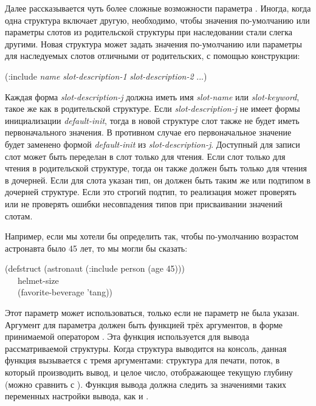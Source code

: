 \begin{flushdesc}
  Далее рассказывается чуть более сложные возможности параметра .
  Иногда, когда одна структура включает другую, необходимо, чтобы значения
  по-умолчанию или параметры слотов из родительской структуры при наследовании
  стали слегка другими.  Новая структура может задать значения по-умолчанию или
  параметры для наследуемых слотов отличными от родительских, с помощью
  конструкции:
  \begin{lisp}
    (:include \emph{name} \emph{slot-description-1} \emph{slot-description-2}
    ...)
  \end{lisp}
  Каждая форма \emph{slot-description-j} должна иметь имя \emph{slot-name} или
  \emph{slot-keyword}, такое же как в родительской структуре.  Если
  \emph{slot-description-j} не имеет формы инициализации \emph{default-init},
  тогда в новой структуре слот также не будет иметь первоначального значения. В
  противном случае его первоначальное значение будет заменено формой
  \emph{default-init} из \emph{slot-description-j}.  Доступный для записи слот
  может быть переделан в слот только для чтения.  Если слот только для чтения в
  родительской структуре, тогда он также должен быть только для чтения в
  дочерней.  Если для слота указан тип, он должен быть таким же или подтипом в
  дочерней структуре. Если это строгий подтип, то реализация может проверять или
  не проверять ошибки несовпадения типов при присваивании значений слотам.

  Например, если мы хотели бы определить  так, чтобы по-умолчанию
  возрастом астронавта было 45 лет, то мы могли бы сказать:
  \begin{lisp}
    (defstruct (astronaut (:include person (age 45))) \\
    ~~~helmet-size \\
    ~~~(favorite-beverage 'tang))
  \end{lisp}

\item[\cd{:print-function}] Этот параметр может использоваться, только
  если не параметр  не была указан.  Аргумент для параметра
   должен быть функцией трёх аргументов, в форме
  принимаемой оператором . Эта функция используется для
  вывода рассматриваемой структуры.  Когда структура выводится на
  консоль, данная функция вызывается с тремя аргументами: структура
  для печати, поток, в который производить вывод, и целое число,
  отображающее текущую глубину (можно сравнить с ).
  Функция вывода должна следить за значениями таких переменных
  настройки вывода, как  и .


\end{flushdesc}
